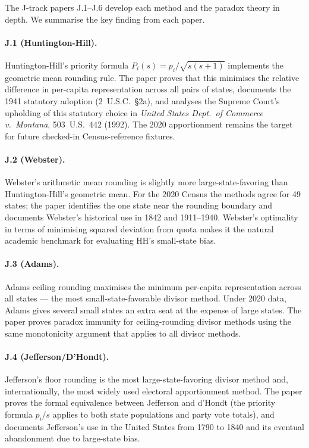 The J-track papers J.1--J.6 develop each method and the paradox theory
in depth.
We summarise the key finding from each paper.

\paragraph{J.1 (Huntington-Hill).}
Huntington-Hill's priority formula $P_i(s) = p_i/\sqrt{s(s+1)}$
implements the geometric mean rounding rule.
The paper proves that this minimises the relative difference in
per-capita representation across all pairs of states,
documents the 1941 statutory adoption (2~U.S.C.\ \S2a),
and analyses the Supreme Court's upholding of this statutory
choice in \textit{United States Dept.\ of Commerce v.\ Montana},
503~U.S.\ 442 (1992).
The 2020 apportionment remains the target for future checked-in
Census-reference fixtures.

\paragraph{J.2 (Webster).}
Webster's arithmetic mean rounding is slightly more large-state-favoring
than Huntington-Hill's geometric mean.
For the 2020 Census the methods agree for 49 states;
the paper identifies the one state near the rounding boundary
and documents Webster's historical use in 1842 and 1911--1940.
Webster's optimality in terms of minimising squared deviation from quota
makes it the natural academic benchmark for evaluating HH's small-state
bias.

\paragraph{J.3 (Adams).}
Adams ceiling rounding maximises the minimum per-capita representation
across all states --- the most small-state-favorable divisor method.
Under 2020 data, Adams gives several small states an extra seat
at the expense of large states.
The paper proves paradox immunity for ceiling-rounding divisor methods
using the same monotonicity argument that applies to all divisor methods.

\paragraph{J.4 (Jefferson/D'Hondt).}
Jefferson's floor rounding is the most large-state-favoring divisor method
and, internationally, the most widely used electoral apportionment method.
The paper proves the formal equivalence between Jefferson and d'Hondt
(the priority formula $p_i/s$ applies to both state populations and
party vote totals), and documents Jefferson's use in the United States
from 1790 to 1840 and its eventual abandonment due to large-state bias.

